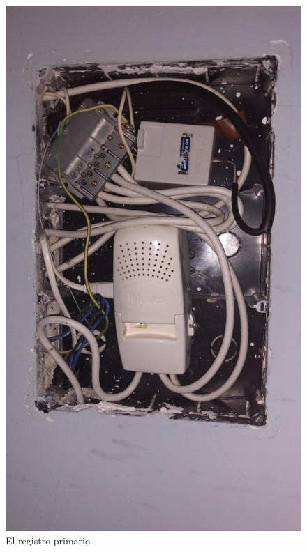\documentclass{article}[12 pt]
\begin{document}
		\begin{figure}
				\centering
				\includegraphics[scale=0.32, angle=90]{registro_primario.jpg}
				\caption{El registro primario}
				\label{f:reg_primario}
		\end{figure}
\end{document}
